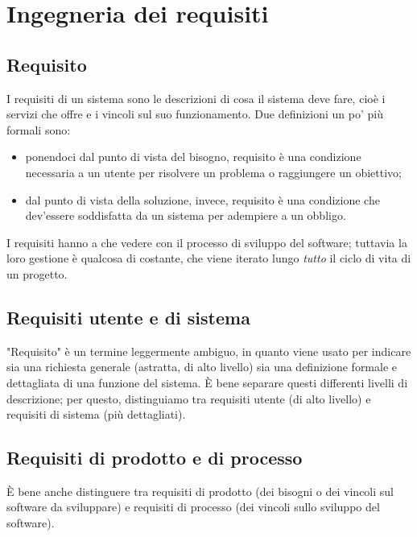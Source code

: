 \documentclass[a4paper]{article}
\begin{document}
		
	\section{Ingegneria dei requisiti}


		
	\subsection{Requisito}

		
I requisiti di un sistema sono le descrizioni di cosa il sistema deve fare, cioè i servizi che offre e i vincoli sul suo funzionamento. Due definizioni un po' più formali sono:
		
	\begin{itemize}
		
			
	\item ponendoci dal punto di vista del bisogno, requisito è una condizione necessaria a un utente per risolvere un problema o raggiungere un obiettivo;
			
	\item dal punto di vista della soluzione, invece, requisito è una condizione che dev'essere soddisfatta da un sistema per adempiere a un obbligo.
		
	\end{itemize}

		
I requisiti hanno a che vedere con il processo di sviluppo del software; tuttavia la loro gestione è qualcosa di costante, che viene iterato lungo \emph{tutto} il ciclo di vita di un progetto.

		
	\subsection{Requisiti utente e di sistema}

		
"Requisito" è un termine leggermente ambiguo, in quanto viene usato per indicare sia una richiesta generale (astratta, di alto livello) sia una definizione formale e dettagliata di una funzione del sistema. È bene separare questi differenti livelli di descrizione; per questo, distinguiamo tra requisiti utente (di alto livello) e requisiti di sistema (più dettagliati).

		
	\subsection{Requisiti di prodotto e di processo}

		
È bene anche distinguere tra requisiti di prodotto (dei bisogni o dei vincoli sul software da sviluppare) e requisiti di processo (dei vincoli sullo sviluppo del software).
\end{document}
